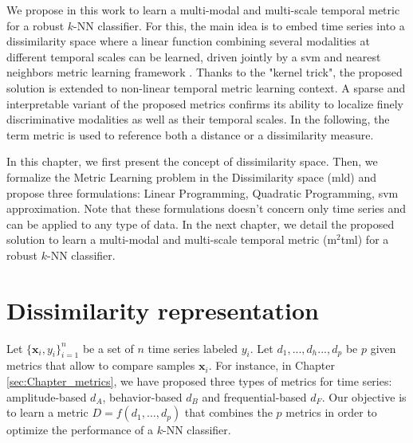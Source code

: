 We propose in this work to learn a multi-modal and multi-scale temporal metric for a robust $k$-NN classifier. For this, the main idea is to embed time series into a dissimilarity space \cite{Pcekalska2002,Duin2012} where a linear function combining several modalities at different temporal scales can be learned, driven jointly by a {\sc svm} and nearest neighbors metric learning framework \cite{Weinberger2009a}. Thanks to the "kernel trick", the proposed solution is extended to non-linear temporal metric learning context. A sparse and interpretable variant of the proposed metrics confirms its ability to localize finely discriminative modalities as well as their temporal scales. In the following, the term metric is used to reference both a distance or a dissimilarity measure.

In this chapter, we first present the concept of dissimilarity space. Then, we formalize the Metric Learning problem in the Dissimilarity space ({\sc mld}) and propose three formulations: Linear Programming, Quadratic Programming, {\sc svm} approximation. Note that these formulations doesn't concern only time series and can be applied to any type of data. In the next chapter, we detail the proposed solution to learn a multi-modal and multi-scale temporal metric ({\sc m$^2$tml}) for a robust $k$-NN classifier.


\section{Dissimilarity representation}
\label{sec:Pairwise_embedding}
Let $\{\textbf{x}_{i}, y_{i}\}_{i=1}^n$ be a set of $n$ time series labeled $y_{i}$. Let  $d_1, ..., d_h ..., d_p$ be $p$ given metrics that allow to compare samples $\textbf{x}_{i}$. For instance, in Chapter \ref{sec:Chapter_metrics}, we have proposed three types of metrics for time series: amplitude-based $d_A$, behavior-based $d_B$ and frequential-based $d_F$. Our objective is to learn a metric $D = f(d_1, \ldots , d_p)$ that combines the $p$ metrics in order to optimize the performance of a $k$-NN classifier.

